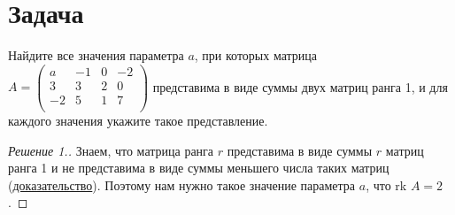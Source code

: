 \documentclass[a4paper]{article}
\theoremstyle{remark}
\begin{document}
    \section*{Задача }
        Найдите все значения параметра $a$, при которых матрица $A = 
        \begin{pmatrix}
            a & -1 & 0 & -2 \\ 
            3 & 3 & 2 & 0 \\ 
            -2 & 5 & 1 & 7 \\ 
        \end{pmatrix} 
        $
        представима в виде суммы двух матриц ранга 1, и для каждого 
        значения укажите такое представление.
	    \begin{proof}[Решение 1.]
            Знаем, что матрица ранга $r$ представима в виде суммы $r$ матриц ранга 1 и не представима
            в виде суммы меньшего числа таких матриц 
            (\href{https://www.youtube.com/watch?v=RgIt32Bc_gc&t=1h0m21s}{доказательство}). 
            Поэтому нам нужно такое значение параметра $a$, что rk $A = 2$. 


\end{proof}
\end{document}
